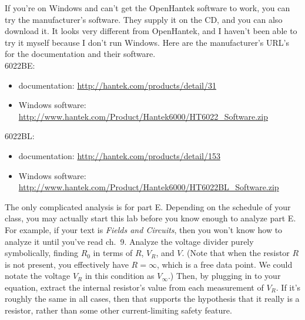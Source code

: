 If you're on Windows and can't get the OpenHantek software to work,
you can try the manufacturer's software. 
They supply it on the CD, and you can also download it. It looks very different
from OpenHantek, and I haven't been able to try it myself because I don't run Windows.
Here are the manufacturer's URL's for the documentation and their software.\\
6022BE:
\begin{itemize}
\item documentation: \url{http://hantek.com/products/detail/31}
\item Windows software: \url{http://www.hantek.com/Product/Hantek6000/HT6022_Software.zip}
\end{itemize}
6022BL:
\begin{itemize}
\item documentation: \url{http://hantek.com/products/detail/153}
\item Windows software: \url{http://www.hantek.com/Product/Hantek6000/HT6022BL_Software.zip}
\end{itemize}

\analysis

The only complicated analysis is for part E. Depending on the schedule of your class,
you may actually start this lab before you know enough to analyze part E. For example, if
your text is \emph{Fields and Circuits}, then you won't know how to analyze it until
you've read ch.~9.
Analyze the voltage divider purely symbolically, finding
$R_0$ in terms of $R$, $V_R$, and $V$. (Note that when the resistor $R$ is not present,
you effectively have $R=\infty$, which is a free data point. We could notate the
voltage $V_R$ in this condition as $V_\infty$.)
Then, by plugging in to your equation, extract the internal resistor's value from each
measurement of $V_R$. If it's roughly the same in all cases, then that supports the hypothesis that it
really is a resistor, rather than some other current-limiting safety feature.
